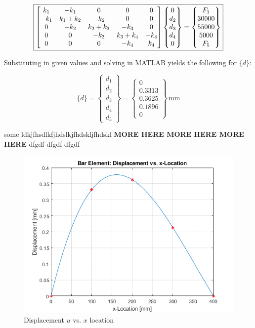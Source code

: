 \documentclass[../main.tex]{subfiles}
\begin{document}
\[
    \boxed{
    \mqty[
        k_1 & -k_1 & 0 & 0 & 0\\
        -k_1 & k_1+k_2 & -k_2 & 0 & 0\\
        0 & -k_2 & k_2+k_3 & -k_3 & 0 \\
        0 & 0 & -k_3 &k_3 + k_4 & -k_4 \\
        0 & 0 & 0 & -k_4 & k_4
    ]
    \begin{Bmatrix}
        0 \\ d_2 \\ d_3 \\d_4 \\ 0
    \end{Bmatrix}
    =
    \begin{Bmatrix}
        F_1 \\ 30000 \\ 55000 \\ 5000 \\ F_5
    \end{Bmatrix}
    }
\]


Substituting in given values and solving in MATLAB yields the following for \(\{d\}\):

\[
    \boxed{\{d\} =     
    \begin{Bmatrix}
        d_1 \\ d_2 \\ d_3 \\d_4 \\d_5
    \end{Bmatrix}
    =
    \begin{Bmatrix}
        0 \\ 0.3313 \\ 0.3625 \\ 0.1896 \\ 0
    \end{Bmatrix} \, \unit{\milli\meter}}
\]


some ldkjfhsdlkfjhdslkjfhdskljfhdskl \textbf{MORE HERE MORE HERE MORE HERE}
dfgdf
dfgdf
dfgdf
\begin{figure}[h!]
    \centering
    \includegraphics[scale=1]{../../images/problem_5/u_vs_x.png}
    \caption{Displacement \(u\) vs. \(x\) location}
    \label{u_vs_x}
\end{figure}
\end{document}
